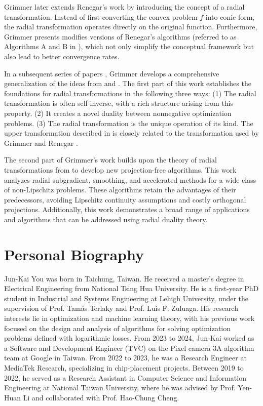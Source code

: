 \documentclass{article}
\begin{document}
Grimmer \cite{Grimmer2018} later extends Renegar's work \cite{Renegar2016} by introducing the concept of a radial transformation. 
Instead of first converting the convex problem $f$ into conic form, the radial transformation operates directly on the original function. 
Furthermore, Grimmer presents modifies versions of Renegar's algorithms (referred to as Algorithms A and B in \cite{Renegar2016}), which not only simplify the conceptual framework but also lead to better convergence rates.

In a subsequent series of papers \cite{Grimmer2024a, Grimmer2024b}, Grimmer develops a comprehensive generalization of the ideas from \cite{Renegar2016} and \cite{Grimmer2018}. 
The first part of this work \cite{Grimmer2024a} establishes the foundations for radial transformations in the following three ways: 
(1) The radial transformation is often self-inverse, with a rich structure arising from this property. 
(2) It creates a novel duality between nonnegative optimization problems. 
(3) The radial transformation is the unique operation of its kind. 
The upper transformation described in \cite{Grimmer2024a} is closely related to the transformation used by Grimmer \cite{Grimmer2018} and Renegar \cite{Renegar2016}.

The second part of Grimmer’s work \cite{Grimmer2024b} builds upon the theory of radial transformations from \cite{Grimmer2024a} to develop new projection-free algorithms. 
This work analyzes radial subgradient, smoothing, and accelerated methods for a wide class of non-Lipschitz problems. 
These algorithms retain the advantages of their predecessors, avoiding Lipschitz continuity assumptions and costly orthogonal projections. 
Additionally, this work demonstrates a broad range of applications and algorithms that can be addressed using radial duality theory.

\section*{Personal Biography}
Jun-Kai You was born in Taichung, Taiwan. He received a master’s degree in Electrical Engineering from National Tsing Hua University. He is a first-year PhD student in Industrial and Systems Engineering at Lehigh University, under the supervision of Prof. Tamás Terlaky and Prof. Luis F. Zuluaga. His research interests lie in optimization and machine learning theory, with his previous work focused on the design and analysis of algorithms for solving optimization problems defined with logarithmic losses. From 2023 to 2024, Jun-Kai worked as a Software and Development Engineer (TVC) on the Pixel camera 3A algorithm team at Google in Taiwan. From 2022 to 2023, he was a Research Engineer at MediaTek Research, specializing in chip-placement projects. Between 2019 to 2022, he served as a Research Assistant in Computer Science and Information Engineering at National Taiwan University, where he was advised by Prof. Yen-Huan Li and collaborated with Prof. Hao-Chung Cheng.




\end{document}
